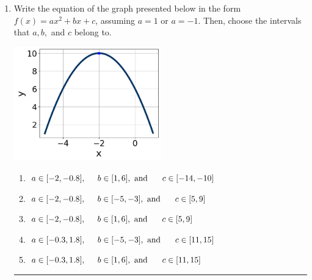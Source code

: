 \documentclass[14pt]{extbook}
\newcommand{\litem}[1]{\item#1\hspace*{-1cm}\rule{\textwidth}{0.4pt}}
\begin{document}
\begin{enumerate}
\litem{
Write the equation of the graph presented below in the form $f(x)=ax^2+bx+c$, assuming  $a=1$ or $a=-1$. Then, choose the intervals that $a, b,$ and $c$ belong to.
\begin{center}
    \includegraphics[width=0.5\textwidth]{../Figures/quadraticGraphToEquationA.png}
\end{center}
\begin{enumerate}[label=\Alph*.]
\item \( a \in [-2, -0.8], \hspace*{5mm} b \in [1, 6], \text{ and } \hspace*{5mm} c \in [-14, -10] \)
\item \( a \in [-2, -0.8], \hspace*{5mm} b \in [-5, -3], \text{ and } \hspace*{5mm} c \in [5, 9] \)
\item \( a \in [-2, -0.8], \hspace*{5mm} b \in [1, 6], \text{ and } \hspace*{5mm} c \in [5, 9] \)
\item \( a \in [-0.3, 1.8], \hspace*{5mm} b \in [-5, -3], \text{ and } \hspace*{5mm} c \in [11, 15] \)
\item \( a \in [-0.3, 1.8], \hspace*{5mm} b \in [1, 6], \text{ and } \hspace*{5mm} c \in [11, 15] \)


\end{enumerate}}
\end{enumerate}
\end{document}
